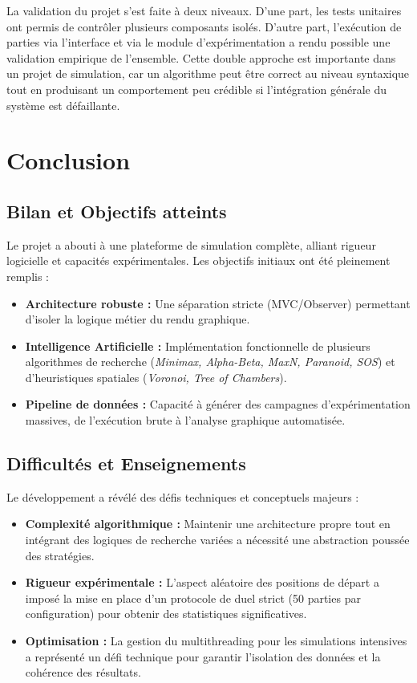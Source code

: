 \documentclass[11pt,a4paper]{article}
\begin{document}
La validation du projet s'est faite à deux niveaux. D'une part, les tests unitaires ont permis de contrôler plusieurs composants isolés. D'autre part, l'exécution de parties via l'interface et via le module d'expérimentation a rendu possible une validation empirique de l'ensemble. Cette double approche est importante dans un projet de simulation, car un algorithme peut être correct au niveau syntaxique tout en produisant un comportement peu crédible si l'intégration générale du système est défaillante.

\section{Conclusion}

\subsection{Bilan et Objectifs atteints}
Le projet a abouti à une plateforme de simulation complète, alliant rigueur logicielle et capacités expérimentales. Les objectifs initiaux ont été pleinement remplis :
\begin{itemize}
    \item \textbf{Architecture robuste :} Une séparation stricte (MVC/Observer) permettant d'isoler la logique métier du rendu graphique.
    \item \textbf{Intelligence Artificielle :} Implémentation fonctionnelle de plusieurs algorithmes de recherche (\textit{Minimax, Alpha-Beta, MaxN, Paranoid, SOS}) et d'heuristiques spatiales (\textit{Voronoi, Tree of Chambers}).
    \item \textbf{Pipeline de données :} Capacité à générer des campagnes d'expérimentation massives, de l'exécution brute à l'analyse graphique automatisée.
\end{itemize}

\subsection{Difficultés et Enseignements}
Le développement a révélé des défis techniques et conceptuels majeurs :
\begin{itemize}
    \item \textbf{Complexité algorithmique :} Maintenir une architecture propre tout en intégrant des logiques de recherche variées a nécessité une abstraction poussée des stratégies.
    \item \textbf{Rigueur expérimentale :} L'aspect aléatoire des positions de départ a imposé la mise en place d'un protocole de duel strict (50 parties par configuration) pour obtenir des statistiques significatives.
    \item \textbf{Optimisation :} La gestion du multithreading pour les simulations intensives a représenté un défi technique pour garantir l'isolation des données et la cohérence des résultats.
\end{itemize}
\end{document}
